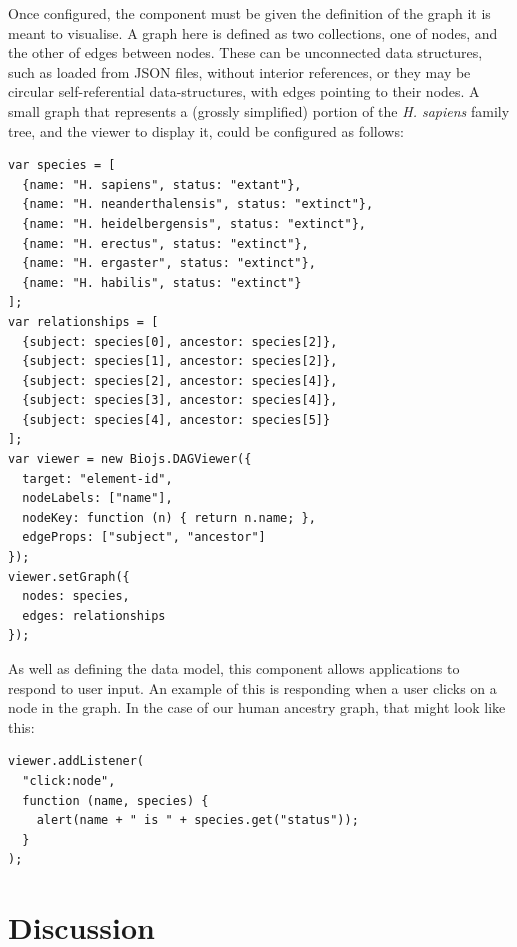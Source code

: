 \documentclass[10pt,a4paper,twocolumn]{article}
\begin{document}
Once configured, the component must be given the definition of the graph it is
meant to visualise. A graph here is defined as two collections, one of nodes,
and the other of edges between nodes. These can be unconnected data structures,
such as loaded from JSON files, without interior references, or they may be
circular self-referential data-structures, with edges pointing to their nodes. A
small graph that represents a (grossly simplified) portion of the \textit{H.
sapiens} family tree, and the viewer to display it, could be configured as
follows:

\begin{lstlisting}[caption={\emph{H. sapiens} phylogenetic tree sample graph}]
var species = [
  {name: "H. sapiens", status: "extant"},
  {name: "H. neanderthalensis", status: "extinct"},
  {name: "H. heidelbergensis", status: "extinct"},
  {name: "H. erectus", status: "extinct"},
  {name: "H. ergaster", status: "extinct"},
  {name: "H. habilis", status: "extinct"}
];
var relationships = [
  {subject: species[0], ancestor: species[2]},
  {subject: species[1], ancestor: species[2]},
  {subject: species[2], ancestor: species[4]},
  {subject: species[3], ancestor: species[4]},
  {subject: species[4], ancestor: species[5]}
];
var viewer = new Biojs.DAGViewer({
  target: "element-id",
  nodeLabels: ["name"],
  nodeKey: function (n) { return n.name; },
  edgeProps: ["subject", "ancestor"]
});
viewer.setGraph({
  nodes: species,
  edges: relationships
});
\end{lstlisting}

As well as defining the data model, this component allows applications to
respond to user input. An example of this is responding when a user clicks on a
node in the graph. In the case of our human ancestry graph, that might look like
this:

\begin{lstlisting}[caption={Listening for Events}, label={code:add-listener}]
viewer.addListener(
  "click:node",
  function (name, species) {
    alert(name + " is " + species.get("status"));
  }
);
\end{lstlisting}

\section*{Discussion}
\end{document}
